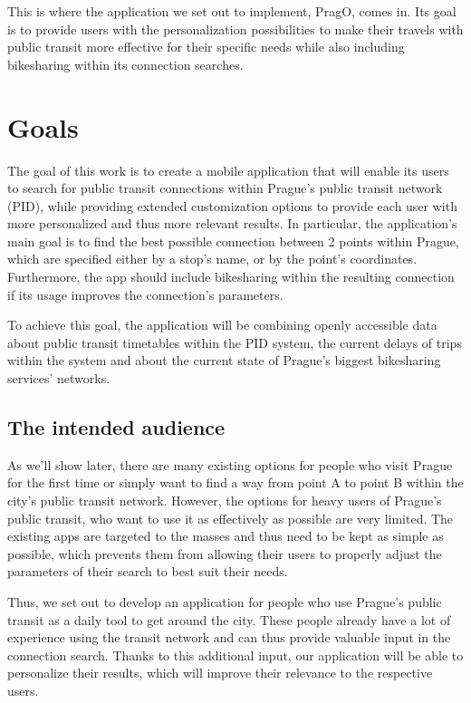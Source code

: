 This is where the application we set out to implement, PragO, comes in. Its goal is to provide users with the personalization possibilities to make their travels with public transit more effective for their specific needs while also including bikesharing within its connection searches. 

\section{Goals}

The goal of this work is to create a mobile application that will enable its users to search for public transit connections within Prague's public transit network (PID), while providing extended customization options to provide each user with more personalized and thus more relevant results. In particular, the application's main goal is to find the best possible connection between 2 points within Prague, which are specified either by a stop's name, or by the point's coordinates. Furthermore, the app should include bikesharing within the resulting connection if its usage improves the connection's parameters.

To achieve this goal, the application will be combining openly accessible data about public transit timetables within the PID system, the current delays of trips within the system and about the current state of Prague's biggest bikesharing services' networks.

\subsection{The intended audience}

As we'll show later, there are many existing options for people who visit Prague for the first time or simply want to find a way from point A to point B within the city's public transit network. However, the options for heavy users of Prague's public transit, who want to use it as effectively as possible are very limited. The existing apps are targeted to the masses and thus need to be kept as simple as possible, which prevents them from allowing their users to properly adjust the parameters of their search to best suit their needs.

Thus, we set out to develop an application for people who use Prague's public transit as a daily tool to get around the city. These people already have a lot of experience using the transit network and can thus provide valuable input in the connection search. Thanks to this additional input, our application will be able to personalize their results, which will improve their relevance to the respective users.

